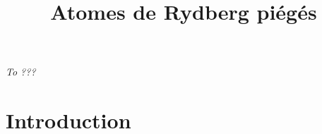 \documentclass[11pt,a4paper,twoside]{book}
\title{Atomes de Rydberg piégés}
\begin{document}
\newcommand{\numv}[1]{\num[output-decimal-marker={,}]{#1}~}
\newcommand{\SIv}[2]{\SI[output-decimal-marker={,}]{#1}{#2}~}
\newcommand{\Kel}{\si{\kelvin}}
\newcommand{\mK}{\si{\milli\kelvin}}
\newcommand{\uK}{\si{\micro\kelvin}}
\newcommand{\citefr}[1]{\cite{#1}}
\renewcommand{\vec}[1]{\mathbf{#1}}
\newcommand{\dip}{d}
\newcommand{\VdW}{van der Waals }
\newcommand{\umx}{\si{\um^6} }
\newcommand{\Rb}[1]{${}^{#1}$Rb}
\newcommand{\Ryd}{\textnormal{Ryd }}
\newcommand{\pdt}{\partial_t}
\newcommand{\eff}{\textnormal{eff }}
\newcommand{\Id}{\mathbb{I}}
\renewcommand{\thefootnote}{\fnsymbol{footnote}}
\renewcommand \thechapter{\Roman{chapter}}
\newcommand{\kb}{\mathrm{k_B}}


\frontmatter
{}
\thispagestyle{empty}
\vspace*{0.2\textheight}
\begin{center}
\emph{To ???}
\end{center}
\vspace*{\fill}\clearpage
\makeatletter
\let\ps@plain\ps@empty

\makeatother

\tableofcontents
\thispagestyle{fancyplain}
\listoffigures
\listoftables
\thispagestyle{fancyplain}
\mainmatter
{}

\chapter*{Introduction}\label{chapter:intro}

\end{document}
